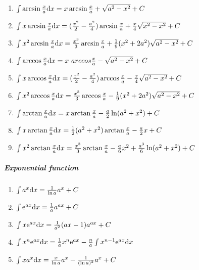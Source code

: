 \begin{tiny}
\begin{enumerate}
\item $ \int \arcsin \frac{x}{a} \mathrm{d} x = x \arcsin \frac{x}{a} + \sqrt{a^2-x^2}+C $

\item $ \int x \arcsin \frac{x}{a} \mathrm{d} x= (\frac{x^2}{2}-\frac{a^2}{4})\arcsin \frac{x}{a} + \frac{x}{4} \sqrt{x^2-x^2}+C$

\item $ \int x^2 \arcsin \frac{x}{a} \mathrm{d} x = \frac{x^3}{3}\arcsin \frac{x}{a}+\frac{1}{9}(x^2+2 a^2)\sqrt{a^2-x^2}+C $

\item $ \int \arccos \frac{x}{a} \md x= x \ arccos \frac{x}{a} - \sqrt{a^2-x^2} +C $

\item $ \int x \arccos \frac{x}{a} \mathrm{d} x= (\frac{x^2}{2}-\frac{a^2}{4})\arccos \frac{x}{a} - \frac{x}{4} \sqrt{a^2-x^2}+C $

\item $ \int x^2 \arccos \frac{x}{a}\mathrm{d} x= \frac{x^3}{3}\arccos \frac{x}{a} - \frac{1}{9}(x^2+2a^2)\sqrt{a^2-x^2}+C$

\item $ \int \arctan \frac{x}{a} \mathrm{d} x=x \arctan \frac{x}{a}-\frac{a}{2}\ln (a^2+x^2)+C $

\item $ \int x\arctan \frac{x}{a} \mathrm{d} x = \frac{1}{2}(a^2+x^2)\arctan \frac{x}{a} -\frac{a}{2}x+C $

\item $ \int x^2 \arctan \frac{x}{a} \mathrm{d} x= \frac{x^3}{3} \arctan \frac{x}{a} - \frac{a}{6}x^2 + \frac{a^3}{6} \ln (a^2+x^2)+C $

\end {enumerate}

\subparagraph{Exponential function}

\begin{enumerate}

\item $ \int a^x \mathrm{d} x= \frac{1}{\ln a} a^x + C$

\item $ \int \mathrm{e} ^{ax}\mathrm{d} x=\frac{1}{a}a^{ax}+C $

\item $ \int x \mathrm{e}  ^ {ax} \mathrm{d} x=\frac{1}{a^2}(ax-1)a^{ax} +C $

\item $ \int x^n \mathrm{e} ^{ax} \mathrm{d} x=\frac{1}{a}x^n \mathrm{e} ^{ax}-\frac{n}{a} \int x^{n-1} \mathrm{e} ^ {ax} \mathrm{d} x $

\item $ \int x a^x \mathrm{d} x = \frac{x}{\ln a}a^x-\frac{1}{(\ln a)^2}a^x+C $


\end{enumerate}
\end{tiny}
